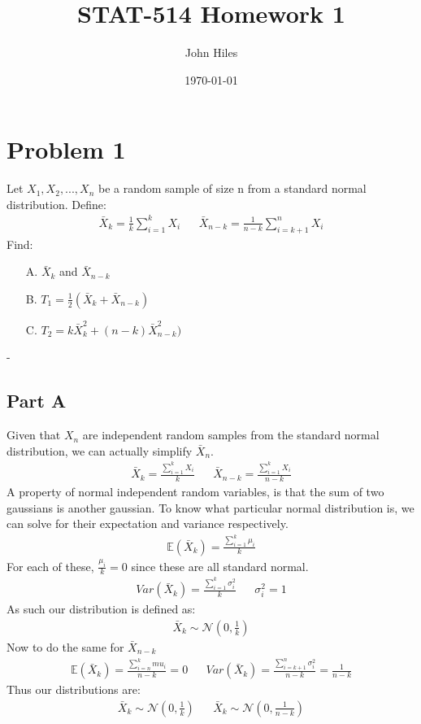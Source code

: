 \documentclass{article}
\title{STAT-514 Homework 1}
\author{John Hiles}
\date\today
\begin{document}
\maketitle %

\section*{Problem 1}
Let $X_1, X_2,..., X_n$ be a random sample of size n from a standard normal distribution. Define:
\begin{align*}
\bar{X}_k = \frac{1}{k} \sum_{i=1}^{k} X_i && \bar{X}_{n-k} = \frac{1}{n-k} \sum_{i=k+1}^{n} X_i 
\end{align*}
Find:
\begin{enumerate}
\item[A.] $\bar{X}_k$ and $\bar{X}_{n-k}$
\item[B.] $T_1 = \frac{1}{2} (\bar{X}_k + \bar{X}_{n-k})$
\item[C.] $T_2 = k\bar{X}_{k}^2 + (n-k) \bar{X}_{n-k}^{2})$
\end{enumerate}-
\subsection*{Part A}
Given that $X_n$ are independent random samples from the standard normal distribution, we can actually simplify $\bar{X}_n$. 
\begin{align*}
\bar{X}_k = \frac{\sum_{i=1}^{k} X_i}{k} && \bar{X}_{n-k} = \frac{\sum_{i=1}^{k} X_i}{n-k}
\end{align*}
A property of normal independent random variables, is that the sum of two gaussians is another gaussian. To know what particular normal distribution is, we can solve for their expectation and variance respectively.
\begin{align*}
\mathbb{E}(\bar{X}_k) = \frac{\sum_{i=1}^{k} \mu_i}{k}
\end{align*}
For each of these, $\frac{\mu_i}{k} = 0$ since these are all standard normal.
\begin{align*}
Var(\bar{X}_k) = \frac{\sum_{i=1}^{k} \sigma^2_i}{k} && \sigma_i^2 = 1
\end{align*}
As such our distribution is defined as:
\begin{align*}
\bar{X}_k \sim \mathcal{N}(0,\frac{1}{k})
\end{align*}
Now to do the same for $\bar{X}_{n-k}$
\begin{align*}
\mathbb{E}(\bar{X}_k) = \frac{\sum_{i=n}^{k} mu_i}{n-k} = 0 && Var(\bar{X}_k) = \frac{\sum_{i=k+1}^{n} \sigma^2_i}{n-k} = \frac{1}{n-k}
\end{align*}
Thus our distributions are:
\begin{align*}
\boxed{\bar{X}_k \sim \mathcal{N}(0,\frac{1}{k})} && \boxed{\bar{X}_k \sim \mathcal{N}(0,\frac{1}{n-k})}
\end{align*}
\end{document}
